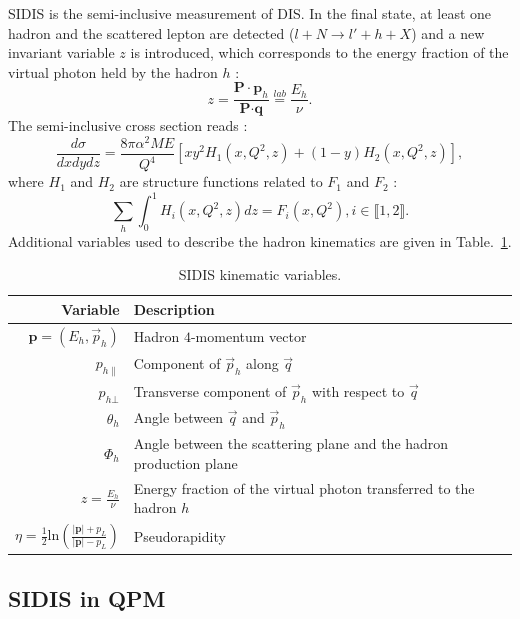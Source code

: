 SIDIS is the semi-inclusive measurement of DIS. In the final state, at least one hadron and the scattered lepton are detected ($l+N \rightarrow l'+h+X$) and a new invariant variable $z$ is introduced, which corresponds to the energy fraction of the virtual photon held by the hadron $h$ :
%
\begin{equation}
  z = \frac{\textbf{P}\cdot\textbf{p}_h}{\textbf{P}\cdot\textbf{q}} \stackrel{lab}{=} \frac{E_h}{\nu}.
  \label{eq:SIDIS}
\end{equation}
%
The semi-inclusive cross section reads \cite{SIDISXS}:
%
\begin{equation}
  \frac{d\sigma}{dxdydz} = \frac{8\pi\alpha^2ME}{Q^4}\left[xy^2H_1(x,Q^2,z)+(1-y)H_2(x,Q^2,z)\right],
  \label{eq:SIDISXS}
\end{equation}
%
where $H_1$ and $H_2$ are structure functions related to $F_1$ and $F_2$ \cite{BERGER,SIDISXS} :
%
\begin{equation}
  \sum\limits_{h}\int_{0}^{1} H_i(x,Q^2,z)dz = F_i(x,Q^2), i \in  \llbracket1,2\rrbracket.
\end{equation}
%
Additional variables used to describe the hadron kinematics are given in Table.~\ref{tab:SIDIS}.

\begin{table}[h!]
  \caption{SIDIS kinematic variables.}
  \label{tab:SIDIS}
  \begin{tabularx}{\textwidth}{r|lX}
    \hline
    \hline
    Variable & Description \\
    \hline
    \hline
    $\textbf{p}=(E_h,\vec{p}_h)$ & Hadron $4$-momentum vector \\
    $p_{h\|}$ & Component of $\vec{p}_h$ along $\vec{q}$ \\
    $p_{h\bot}$ & Transverse component of $\vec{p}_h$ with respect to $\vec{q}$ \\
    $\theta_h$ & Angle between $\vec{q}$ and $\vec{p}_h$ \\
    $\Phi_h$ & Angle between the scattering plane and the hadron production plane \\
    $z=\frac{E_h}{\nu}$ & Energy fraction of the virtual photon transferred to the hadron $h$ \\
    $\eta=\frac{1}{2}\text{ln}\left(\frac{|\mathbf{p}|+p_L}{|\mathbf{p}|-p_L} \right)$ & Pseudorapidity \\
    \hline
    \hline
  \end{tabularx}
\end{table}

\subsection{SIDIS in QPM}

